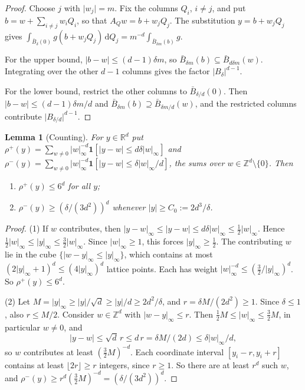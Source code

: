 \documentclass[11pt]{amsart}
\newtheorem{lemma}{Lemma}
\theoremstyle{remark}
\newcommand{\R}{\mathbb{R}}
\newcommand{\Z}{\mathbb{Z}}
\newcommand{\dd}{\,\mathrm{d}}
\newcommand{\abs}[1]{\lvert #1\rvert}
\newcommand{\norm}[1]{\lvert #1\rvert}
\newcommand{\supn}[1]{\lvert #1\rvert_\infty}
\newcommand{\1}{\mathbf{1}}
\begin{document}
\begin{proof}
Choose $j$ with $\abs{w_j}=m$. Fix the columns $Q_i$, $i\ne j$, and put
$b=w+\sum_{i\ne j}w_iQ_i$, so that $A_Qw=b+w_jQ_j$. The substitution $y=b+w_jQ_j$ gives
$\int_{\bar B_\delta(0)}g(b+w_jQ_j)\dd Q_j=m^{-d}\int_{\bar B_{\delta m}(b)}g$.

For the upper bound, $\norm{b-w}\le(d-1)\delta m$, so $\bar B_{\delta m}(b)\subseteq\bar B_{d\delta m}(w)$.
Integrating over the other $d-1$ columns gives the factor $\abs{B_\delta}^{d-1}$.

For the lower bound, restrict the other columns to $\bar B_{\delta/d}(0)$. Then
$\norm{b-w}\le(d-1)\delta m/d$ and $\bar B_{\delta m}(b)\supseteq\bar B_{\delta m/d}(w)$, and the
restricted columns contribute $\abs{B_{\delta/d}}^{d-1}$.
\end{proof}

\begin{lemma}[Counting]\label{lem:count}
For $y\in\R^d$ put $\rho^+(y)=\sum_{w\ne0}\supn w^{-d}\1[\norm{y-w}\le d\delta\supn w]$ and
$\rho^-(y)=\sum_{w\ne0}\supn w^{-d}\1[\norm{y-w}\le\delta\supn w/d]$, the sums over
$w\in\Z^d\setminus\{0\}$. Then
\begin{enumerate}
\item $\rho^+(y)\le6^d$ for all $y$;
\item $\rho^-(y)\ge(\delta/(3d^2))^d$ whenever $\norm y\ge C_0:=2d^3/\delta$.
\end{enumerate}
\end{lemma}

\begin{proof}
(1) If $w$ contributes, then $\supn{y-w}\le\norm{y-w}\le d\delta\supn w\le\tfrac12\supn w$. Hence
$\tfrac12\supn w\le\supn y\le\tfrac32\supn w$. Since $\supn w\ge1$, this forces
$\supn y\ge\tfrac12$. The contributing $w$ lie in the cube $\{\supn{w-y}\le\supn y\}$, which
contains at most $(2\supn y+1)^d\le(4\supn y)^d$ lattice points. Each has weight
$\supn w^{-d}\le(\tfrac32/\supn y)^d$. So $\rho^+(y)\le6^d$.

(2) Let $M=\supn y\ge\norm y/\sqrt d\ge\norm y/d\ge2d^2/\delta$, and $r=\delta M/(2d^2)\ge1$.
Since $\delta\le1$, also $r\le M/2$. Consider $w\in\Z^d$ with $\supn{w-y}\le r$. Then
$\tfrac12M\le\supn w\le\tfrac32M$, in particular $w\ne0$, and
\[
  \norm{y-w}\le\sqrt d\,r\le d\,r=\delta M/(2d)\le\delta\supn w/d ,
\]
so $w$ contributes at least $(\tfrac32M)^{-d}$. Each coordinate interval
$[y_i-r,y_i+r]$ contains at least $\lfloor2r\rfloor\ge r$ integers, since $r\ge1$. So there are
at least $r^d$ such $w$, and $\rho^-(y)\ge r^d(\tfrac32M)^{-d}=(\delta/(3d^2))^d$.
\end{proof}
\end{document}
